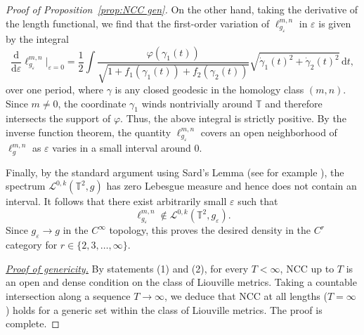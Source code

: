 \documentclass[11pt,letterpaper,oneside]{amsart}
\newcommand{\T}{\mathbb{T}}
\renewcommand{\phi}{\varphi}
\theoremstyle{definition}
\theoremstyle{remark}
\newcommand{\eps}{\varepsilon}
\theoremstyle{definition}
\theoremstyle{remark}
\newcommand{\CL}{\mathcal{L}}
\newcommand{\dif}{\mathrm{d}}
\begin{document}
\begin{proof}[Proof of Proposition~\ref{prop:NCC gen}]
\medskip

    On the other hand, taking the derivative of the length functional, we find that the first-order variation of $\ell^{m,n}_{g_\eps}$ in $\eps$ is given by the integral
	\begin{equation}
		\frac{\dif}{\dif \eps} \ell^{m,n}_{g_\eps}\bigg|_{\eps = 0} = \frac12 \int \frac{\phi(\gamma_1(t))}{\sqrt{1 + f_1(\gamma_1(t)) + f_2(\gamma_2(t))}} \sqrt{\dot\gamma_1(t)^2 + \dot\gamma_2(t)^2} \,\dif t,
	\end{equation}
	over one period, where $\gamma$ is any closed geodesic in the homology class $(m,n)$.
	Since $m \neq 0$, the coordinate $\gamma_1$ winds nontrivially around $\T$ and therefore intersects the support of $\phi$. Thus, the above integral is strictly positive.
	By the inverse function theorem, the quantity $\ell^{m,n}_{g_\eps}$ covers an open neighborhood of $\ell^{m,n}_g$ as $\eps$ varies in a small interval around $0$.
    
    \medskip
	
    Finally, by the standard argument using Sard's Lemma (see for example \cite{Hirsch}), the spectrum $\CL^{0,k}(\T^2, g)$ has zero Lebesgue measure and hence does not contain an interval. 
    It follows that there exist arbitrarily small $\eps$ such that
    \begin{equation*}
        \ell^{m,n}_{g_\eps} \notin \CL^{0,k}(\T^2, g_\eps).
    \end{equation*}
	Since $g_\eps \to g$ in the $C^\infty$ topology, this proves the desired density in the $C^r$ category for $r \in \{2,3,\ldots,\infty\}$.

    \medskip

    \noindent \underline{\textit{Proof of genericity.}} By statements (1) and (2), for every $T < \infty$, NCC up to $T$ is an open and dense condition on the class of Liouville metrics. Taking a countable intersection along a sequence $T \to \infty$, we deduce that NCC at all lengths ($T = \infty$) holds for a generic set within the class of Liouville metrics. 
    The proof is complete.
\end{proof}










\end{document}
